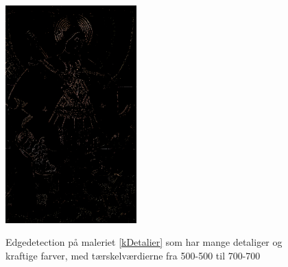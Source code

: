 \begin{figure}[!h]
{        \includegraphics[angle=0,width=0.45\textwidth]{afsnit/afprovning/billeder/thressholds/krafitige_farver/krafite_detalier/1_iteration/700-700.png}
        \label{700-700}}\hspace{1em}
    \caption[]{Edgedetection på maleriet \ref{kDetalier} som har mange detaliger og kraftige farver, med tærskelværdierne fra 500-500 til 700-700}
     \label{allesammen2}
\end{figure}

